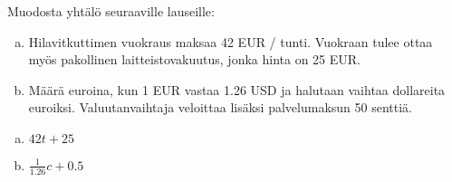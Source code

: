 \begin{tehtava}
  Muodosta yhtälö seuraaville lauseille:
  \begin{enumerate}[a)]
    \item Hilavitkuttimen vuokraus maksaa 42 EUR / tunti. Vuokraan tulee ottaa myös pakollinen laitteistovakuutus, jonka hinta on 25 EUR.
    \item Määrä euroina, kun 1 EUR vastaa 1.26 USD ja halutaan vaihtaa dollareita euroiksi. Valuutanvaihtaja veloittaa lisäksi palvelumaksun 50 senttiä.
  \end{enumerate}

  \begin{vastaus}
    \begin{enumerate}[a)]
      \item $42t + 25$
      \item $\frac{1}{1.26}c + 0.5$
    \end{enumerate}
  \end{vastaus}
\end{tehtava}
